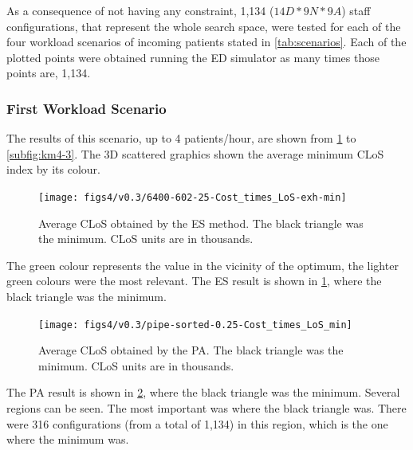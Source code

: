 As a consequence of not having any constraint, 1,134 ($14D*9N*9A$)
staff configurations, that represent the whole search space, were
tested for each of the four workload scenarios of incoming patients
stated in \ref{tab:scenarios}. Each of the plotted points were obtained
running the ED simulator as many times those points are, 1,134.


\subsubsection{First Workload Scenario}

The results of this scenario, up to 4 patients/hour, are shown from
\ref{subfig:es4-3} to \ref{subfig:km4-3}. The 3D scattered graphics
shown the average minimum CLoS index by its colour. 
\begin{figure}[H]
\centering{}\texttt{[image: figs4/v0.3/6400-602-25-Cost\_times\_LoS-exh-min]}\caption{Average CLoS obtained by the ES method. The black triangle was the
minimum. CLoS units are in thousands. \label{subfig:es4-3}}
\end{figure}
The green colour represents the value in the vicinity of the optimum,
the lighter green colours were the most relevant. The ES result is
shown in \ref{subfig:es4-3}, where the black triangle was the minimum. 

\begin{figure}[H]
\centering{}\texttt{[image: figs4/v0.3/pipe-sorted-0.25-Cost\_times\_LoS\_min]}\caption{Average CLoS obtained by the PA. The black triangle was the minimum.
CLoS units are in thousands.\label{subfig:pipe4-3}}
\end{figure}
The PA result is shown in \ref{subfig:pipe4-3}, where the black triangle
was the minimum. Several regions can be seen. The most important was
where the black triangle was. There were 316 configurations (from
a total of 1,134) in this region, which is the one where the minimum
was.

